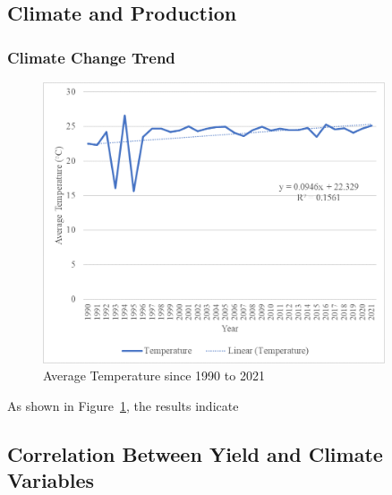\subsection{Climate and Production}

\subsubsection{Climate Change Trend}
\begin{figure}[ht]
    \centering
    \caption{Average Temperature since 1990 to 2021} 
    \label{fig:trend_avg_temp}
    \includegraphics[width=0.9\textwidth]{images/trend_avg_temp.png}
\end{figure}

As shown in Figure~\ref{fig:trend_avg_temp}, the results indicate


\subsection{Correlation Between Yield and Climate Variables}


\begin{table}[h]
    \centering
    \caption{Correlation Table between Yield and Climate Variables}
\end{table}

